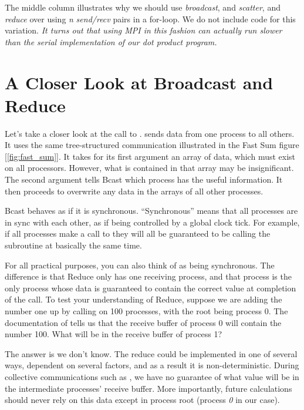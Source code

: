 The middle column illustrates why we should use \emph{broadcast}, and \emph{scatter}, and \emph{reduce} over using \emph{n} \emph{send/recv} pairs in a for-loop. We do not include code for this variation. \emph{It turns out that using MPI in this fashion can actually run slower than the serial implementation of our dot product program.}



\section*{A Closer Look at Broadcast and Reduce}
Let's take a closer look at the call to .  sends data from one process to all others. It uses the same tree-structured communication illustrated in the Fast Sum figure [\ref{fig:fast_sum}]. It takes for its first argument an array of data, which must exist on all processors. However, what is contained in that array may be insignificant. The second argument tells Bcast which process has the useful information. It then proceeds to overwrite any data in the arrays of all other processes.

Bcast behaves as if it is synchronous. ``Synchronous'' means that all processes are in sync with each other, as if being controlled by a global clock tick. For example, if all processes make a call to  they will all be guaranteed to be calling the subroutine at basically the same time.

For all practical purposes, you can also think of  as being synchronous. The difference is that Reduce only has one receiving process, and that process is the only process whose data is guaranteed to contain the correct value at completion of the call. To test your understanding of Reduce, suppose we are adding the number one up by calling  on 100 processes, with the root being process 0. The documentation of  tells us that the receive buffer of process 0 will contain the number 100. What will be in the receive buffer of process 1?

The answer is we don't know. The reduce could be implemented in one of several ways, dependent on several factors, and as a result it is non-deterministic. During collective communications such as , we have no guarantee of what value will be in the intermediate processes' receive buffer. More importantly, future calculations should never rely on this data except in process root (process \emph{0} in our case).



